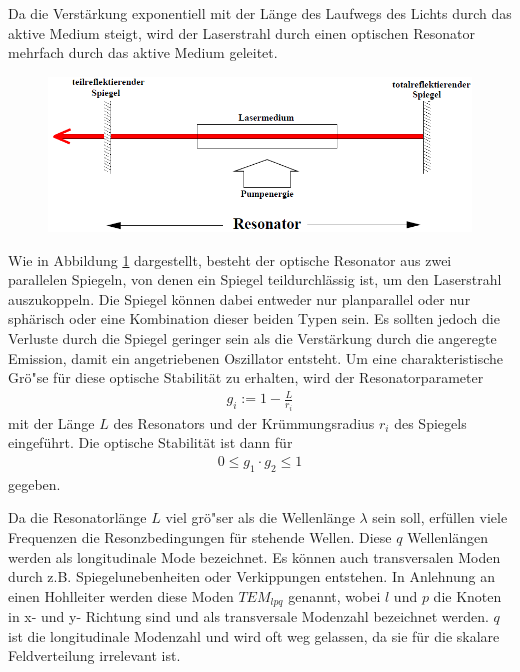 \documentclass[]{scrartcl}
\begin{document}
Da die Verstärkung exponentiell mit der Länge des Laufwegs des Lichts durch das aktive Medium steigt, wird der Laserstrahl durch einen optischen Resonator mehrfach durch das aktive Medium geleitet.

\begin{figure}[h]
 \centering
 \includegraphics[width=12cm]{images/schema_resonator.png}
 \label{fig:schema_resonator}
\end{figure}

Wie in Abbildung \ref{fig:schema_resonator} dargestellt, besteht der optische Resonator aus zwei parallelen Spiegeln, von denen ein Spiegel teildurchlässig ist, um den Laserstrahl auszukoppeln.
Die Spiegel können dabei entweder nur planparallel oder nur sphärisch oder eine Kombination dieser beiden Typen sein.
Es sollten jedoch die Verluste durch die Spiegel geringer sein als die Verstärkung durch die angeregte Emission, damit ein angetriebenen Oszillator entsteht.
Um eine charakteristische Grö"se für diese optische Stabilität zu erhalten, wird der Resonatorparameter
\begin{align}
 g_i := 1- \frac{L}{r_i}
\end{align}
mit der Länge $L$ des Resonators und der Krümmungsradius $r_i$ des Spiegels eingeführt.
Die optische Stabilität ist dann für
\begin{align}
0 \le g_1 \cdot g_2 \le 1 
\label{eq:stabilitaet}
\end{align}
gegeben.

Da die Resonatorlänge $L$ viel grö"ser als die Wellenlänge $\lambda$ sein soll, erfüllen viele Frequenzen die Resonzbedingungen für stehende Wellen. 
Diese $q$ Wellenlängen werden als longitudinale Mode bezeichnet. Es können auch transversalen Moden durch z.B. Spiegelunebenheiten oder Verkippungen entstehen.
In Anlehnung an einen Hohlleiter werden diese Moden $TEM_{lpq}$ genannt, wobei $l$ und $p$ die Knoten in x- und y- Richtung sind und als transversale Modenzahl bezeichnet werden.
$q$ ist die longitudinale Modenzahl und wird oft weg gelassen, da sie für die skalare Feldverteilung irrelevant ist.  
\end{document}
